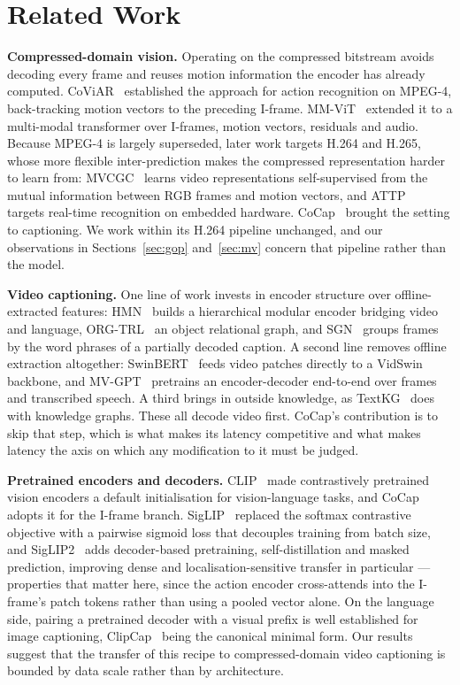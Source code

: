 \documentclass[10pt,twocolumn,letterpaper]{article}
\begin{document}
\section{Related Work}
\label{sec:related}

\textbf{Compressed-domain vision.} Operating on the compressed bitstream avoids decoding every
frame and reuses motion information the encoder has already computed. CoViAR~\cite{coviar}
established the approach for action recognition on MPEG-4, back-tracking motion vectors to the
preceding I-frame. MM-ViT~\cite{mmvit} extended it to a multi-modal transformer over I-frames,
motion vectors, residuals and audio. Because MPEG-4 is largely superseded, later work targets
H.264 and H.265, whose more flexible inter-prediction makes the compressed representation harder
to learn from: MVCGC~\cite{mvcgc} learns video representations self-supervised from the mutual
information between RGB frames and motion vectors, and ATTP~\cite{attp} targets real-time
recognition on embedded hardware. CoCap~\cite{cocap} brought the setting to captioning. We work
within its H.264 pipeline unchanged, and our observations in
Sections~\ref{sec:gop} and~\ref{sec:mv} concern that pipeline rather than the model.

\textbf{Video captioning.} One line of work invests in encoder structure over offline-extracted
features: HMN~\cite{hmn} builds a hierarchical modular encoder bridging video and language,
ORG-TRL~\cite{orgtrl} an object relational graph, and SGN~\cite{sgn} groups frames by the word
phrases of a partially decoded caption. A second line removes offline extraction altogether:
SwinBERT~\cite{swinbert} feeds video patches directly to a VidSwin backbone, and
MV-GPT~\cite{mvgpt} pretrains an encoder-decoder end-to-end over frames and transcribed speech.
A third brings in outside knowledge, as TextKG~\cite{textkg} does with knowledge graphs. These
all decode video first. CoCap's contribution is to skip that step, which is what makes its
latency competitive and what makes latency the axis on which any modification to it must be
judged.

\textbf{Pretrained encoders and decoders.} CLIP~\cite{clip} made contrastively pretrained vision
encoders a default initialisation for vision-language tasks, and CoCap adopts it for the
I-frame branch. SigLIP~\cite{siglip} replaced the softmax contrastive objective with a pairwise
sigmoid loss that decouples training from batch size, and SigLIP2~\cite{siglip2} adds
decoder-based pretraining, self-distillation and masked prediction, improving dense and
localisation-sensitive transfer in particular --- properties that matter here, since the action
encoder cross-attends into the I-frame's patch tokens rather than using a pooled vector alone.
On the language side, pairing a pretrained decoder with a visual prefix is well established for
image captioning, ClipCap~\cite{clipcap} being the canonical minimal form. Our results suggest
that the transfer of this recipe to compressed-domain video captioning is bounded by data scale
rather than by architecture.
\end{document}
